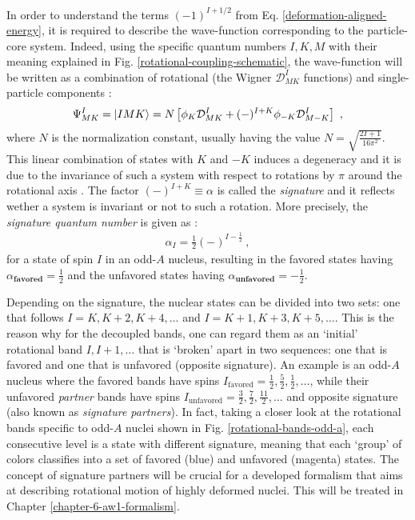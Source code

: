 In order to understand the terms $(-1)^{I+1/2}$ from Eq. \ref{deformation-aligned-energy}, it is required to describe the wave-function corresponding to the particle-core system. Indeed, using the specific quantum numbers $I,K,M$ with their meaning explained in Fig. \ref{rotational-coupling-schematic}, the wave-function will be written as a combination of rotational (the Wigner $\mathcal{D}_{MK}^I$ functions) and single-particle components \cite{wang2007exotic,davydov1958rotational}:
\begin{align}
    \Psi_{MK}^I=\ket{IMK}=N\left[\phi_K \mathcal{D}_{MK}^I+(-)^{I+K}\phi_{-K}\mathcal{D}_{M-K}^I\right]\ ,
    \label{RAL-bands-wave-function}
\end{align}
where $N$ is the normalization constant, usually having the value $N=\sqrt{\frac{2I+1}{16\pi^2}}$. This linear combination of states with $K$ and $-K$ induces a degeneracy and it is due to the invariance of such a system with respect to rotations by $\pi$ around the rotational axis \cite{frauendorf1997tilted,bohr1998nuclear}. The factor $(-)^{I+K}\equiv\alpha$ is called the \emph{signature} and it reflects wether a system is invariant or not to such a rotation. More precisely, the \emph{signature quantum number} is given as \cite{sun1994varied}:
\begin{align}
    \alpha_I=\frac{1}{2}(-)^{I-\frac{1}{2}}\ ,
    \label{signature-quantum-number}
\end{align}
for a state of spin $I$ in an odd-$A$ nucleus, resulting in the favored states having $\alpha_\textbf{favored}=\frac{1}{2}$ and the unfavored states having $\alpha_\textbf{unfavored}=-\frac{1}{2}$.

Depending on the signature, the nuclear states can be divided into two sets: one that follows $I=K,K+2,K+4,\dots$ and $I=K+1,K+3,K+5,\dots$. This is the reason why for the decoupled bands, one can regard them as an `initial' rotational band $I,I+1,\dots$ that is `broken' apart in two sequences: one that is favored and one that is unfavored (opposite signature).
An example is an odd-$A$ nucleus where the favored bands have spins $I_\text{favored}=\frac{1}{2},\frac{5}{2},\frac{1}{2},\dots$, while their unfavored \emph{partner} bands have spins $I_\text{unfavored}=\frac{3}{2},\frac{7}{2},\frac{11}{2},\dots$ and opposite signature (also known as \emph{signature partners}). In fact, taking a closer look at the rotational bands specific to odd-$A$ nuclei shown in Fig. \ref{rotational-bands-odd-a}, each consecutive level is a state with different signature, meaning that each `group' of colors classifies into a set of favored (blue) and unfavored (magenta) states. The concept of signature partners will be crucial for a developed formalism that aims at describing rotational motion of highly deformed nuclei. This will be treated in Chapter \ref{chapter-6-aw1-formalism}.

